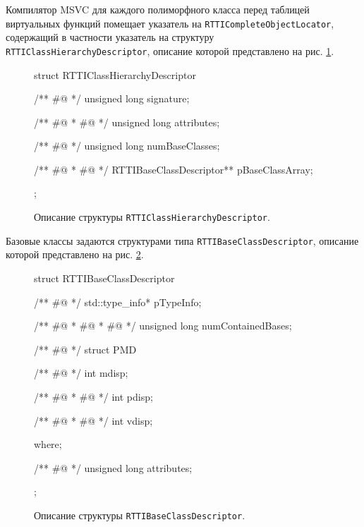 Компилятор MSVC для каждого полиморфного класса перед таблицей виртуальных функций помещает указатель на \lstinline{RTTICompleteObjectLocator}, содержащий в частности указатель на структуру \lstinline{RTTIClassHierarchyDescriptor}, описание которой представлено на рис. \ref{listing:rtticlasshierarchydescriptor}.

\begin{figure}[htb!]
\hspace{2cm}
\begin{minipage}[b]{1cm}
\begin{cplusplus}
struct RTTIClassHierarchyDescriptor {
  /** #@ */
  unsigned long signature;
  
  /** #@
   * #@ */
  unsigned long attributes;
  
  /** #@ */
  unsigned long numBaseClasses;
  
  /** #@ 
   * #@ */
  RTTIBaseClassDescriptor** pBaseClassArray;
};
\end{cplusplus}
\end{minipage}
\caption{Описание структуры \lstinline{RTTIClassHierarchyDescriptor}.}
\label{listing:rtticlasshierarchydescriptor}
\end{figure}

Базовые классы задаются структурами типа \lstinline{RTTIBaseClassDescriptor}, описание которой представлено на рис. \ref{listing:rttibaseclassdescriptor}.

\begin{figure}[htb!]
\hspace{2cm}
\begin{minipage}[b]{1cm}
\begin{cplusplus}
struct RTTIBaseClassDescriptor {
  /** #@ */
  std::type_info* pTypeInfo;
  
  /** #@
   * #@
   * #@ */
  unsigned long numContainedBases;
  
  /** #@ */
  struct PMD {
    /** #@ */
    int mdisp;
    
    /** #@
     * #@ */
    int pdisp;
    
    /** #@
     * #@ */
    int vdisp;
  } where;
  
  /** #@ */
  unsigned long attributes;
};
\end{cplusplus}
\end{minipage}
\caption{Описание структуры \lstinline{RTTIBaseClassDescriptor}.}
\label{listing:rttibaseclassdescriptor}
\end{figure}

